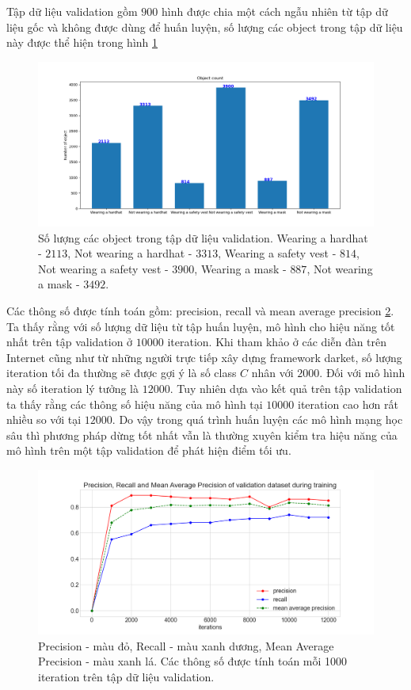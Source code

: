 Tập dữ liệu validation gồm $900$ hình được chia một cách ngẫu nhiên từ tập dữ liệu gốc và không được dùng để huấn luyện, số lượng các object trong tập dữ liệu này được thể hiện trong hình \ref{fig:validation_set}
\begin{figure}[ht!]
	\centerline{\includegraphics[scale=0.5]{images/validation_set.png}}
  	\caption{Số lượng các object trong tập dữ liệu validation. Wearing a hardhat - $2113$, Not wearing a hardhat - $3313$, Wearing a safety vest - $814$, Not wearing a safety vest - $3900$, Wearing a mask - $887$, Not wearing a mask - $3492$.}
  	\label{fig:validation_set}
\end{figure}

Các thông số được tính toán gồm: precision, recall và mean average precision \ref{fig:precision_recall_map}. Ta thấy rằng với số lượng dữ liệu từ tập huấn luyện, mô hình cho hiệu năng tốt nhất trên tập validation ở $10000$ iteration. Khi tham khảo ở các diễn đàn trên Internet cũng như từ những người trực tiếp xây dựng framework darket, số lượng iteration tối đa thường sẽ được gợi ý là số class $C$ nhân với $2000$. Đối với mô hình này số iteration lý tưởng là $12000$. Tuy nhiên dựa vào kết quả trên tập validation ta thấy rằng các thông số hiệu năng của mô hình tại $10000$ iteration cao hơn rất nhiều so với tại $12000$. Do vậy trong quá trình huấn luyện các mô hình mạng học sâu thì phương pháp dừng tốt nhất vẫn là thường xuyên kiểm tra hiệu năng của mô hình trên một tập validation để phát hiện điểm tối ưu.
\begin{figure}[ht!]
	\centerline{\includegraphics[scale=0.5]{images/precision_recall_map.png}}
  	\caption{Precision - màu đỏ, Recall - màu xanh dương, Mean Average Precision - màu xanh lá. Các thông số được tính toán mỗi 1000 iteration trên tập dữ liệu validation.}
  	\label{fig:precision_recall_map}
\end{figure}

